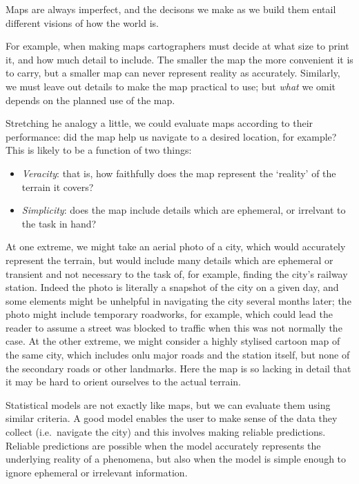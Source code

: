 \documentclass[]{article}
\providecommand{\tightlist}{%
  \setlength{\itemsep}{0pt}\setlength{\parskip}{0pt}}
\theoremstyle{definition}
\theoremstyle{definition}
\theoremstyle{definition}
\theoremstyle{remark}
\begin{document}
Maps are always imperfect, and the decisons we make as we build them
entail different visions of how the world is.

For example, when making maps cartographers must decide at what size to
print it, and how much detail to include. The smaller the map the more
convenient it is to carry, but a smaller map can never represent reality
as accurately. Similarly, we must leave out details to make the map
practical to use; but \emph{what} we omit depends on the planned use of
the map.

Stretching he analogy a little, we could evaluate maps according to
their performance: did the map help us navigate to a desired location,
for example? This is likely to be a function of two things:

\begin{itemize}
\tightlist
\item
  \emph{Veracity}: that is, how faithfully does the map represent the
  `reality' of the terrain it covers?
\item
  \emph{Simplicity}: does the map include details which are ephemeral,
  or irrelvant to the task in hand?
\end{itemize}

At one extreme, we might take an aerial photo of a city, which would
accurately represent the terrain, but would include many details which
are ephemeral or transient and not necessary to the task of, for
example, finding the city's railway station. Indeed the photo is
literally a snapshot of the city on a given day, and some elements might
be unhelpful in navigating the city several months later; the photo
might include temporary roadworks, for example, which could lead the
reader to assume a street was blocked to traffic when this was not
normally the case. At the other extreme, we might consider a highly
stylised cartoon map of the same city, which includes onlu major roads
and the station itself, but none of the secondary roads or other
landmarks. Here the map is so lacking in detail that it may be hard to
orient ourselves to the actual terrain.

Statistical models are not exactly like maps, but we can evaluate them
using similar criteria. A good model enables the user to make sense of
the data they collect (i.e.~navigate the city) and this involves making
reliable predictions. Reliable predictions are possible when the model
accurately represents the underlying reality of a phenomena, but also
when the model is simple enough to ignore ephemeral or irrelevant
information.
\end{document}

